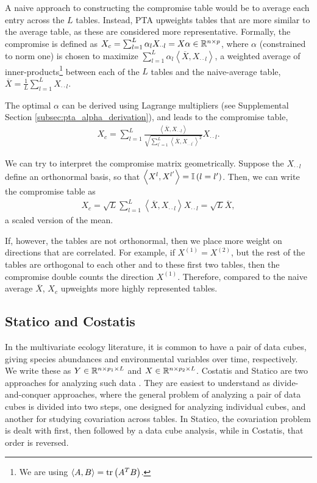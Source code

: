 \documentclass{article}
\begin{document}
A naive approach to constructing the compromise table would be to average each
entry across the $L$ tables. Instead, PTA upweights tables that are more similar
to the average table, as these are considered more representative. Formally, the
compromise is defined as $X_c = \sum_{l = 1}^{L}\alpha_{l} X_{\cdot\cdot l}
= X\alpha \in \mathbb{R}^{n \times p}$, where $\alpha$ (constrained to norm one) is
chosen to maximize $\sum_{l = 1}^{L} \alpha_{l} \left<\overline{X},
X_{\cdot\cdot l}\right>$, a weighted average of inner-products\footnote{We are
  using $\left<A, B\right> = \mathop\mathrm{tr}\left(A^{T}B\right)$.} between each of the $L$
tables and the naive-average table, $\overline{X} = \frac{1}{L}\sum_{l = 1}^{L}
X_{\cdot\cdot l}$.

The optimal $\alpha$ can be derived using Lagrange multipliers (see Supplemental
Section \ref{subsec:pta_alpha_derivation}), and leads to the compromise table,
\begin{align*}
  X_{c} = \sum_{l = 1}^{L} \frac{\left<\overline{X}, X_{\cdot\cdot l}\right>}{\sqrt{\sum_{l^{\prime}
      =1}^{L}\left<\overline{X},
      X_{\cdot\cdot l^{\prime}}\right>^{2}}} X_{\cdot\cdot l}.
\end{align*}

We can try to interpret the compromise matrix geometrically. Suppose
the $X_{\cdot\cdot l}$ define an orthonormal basis, so that $\left<X^{l},
  X^{l^{\prime}}\right> = \mathbb{I}\left({l = l^{\prime}}\right)$. Then, we can write
the compromise table as
\begin{align*}
  X_{c} = \sqrt{L}\sum_{l = 1}^{L}\left<\overline{X},
    X_{\cdot\cdot l}\right>X_{\cdot\cdot l} = \sqrt{L}\overline{X},
\end{align*}
a scaled version of the mean.

If, however, the tables are not orthonormal, then we place more weight on
directions that are correlated. For example, if $X^{(1)} = X^{(2)}$, but the
rest of the tables are orthogonal to each other and to these first two tables,
then the compromise double counts the direction $X^{(1)}$. Therefore, compared
to the naive average $\overline{X}$, $X_c$ upweights more highly represented
tables.

\subsection{Statico and Costatis}
\label{subsec:statico_and_costatis}

In the multivariate ecology literature, it is common to have a pair of data
cubes, giving species abundances and environmental variables over time,
respectively. We write these as $Y \in \mathbb{R}^{n \times p_{1} \times L}$ and $X
\in \mathbb{R}^{n \times p_{2} \times L}$. Costatis and Statico are two approaches
for analyzing such data \citep{thioulouse2011simultaneous}. They are easiest to
understand as divide-and-conquer approaches, where the general problem of
analyzing a pair of data cubes is divided into two steps, one designed for
analyzing individual cubes, and another for studying covariation across tables.
In Statico, the covariation problem is dealt with first, then followed by a data
cube analysis, while in Costatis, that order is reversed.
\end{document}
